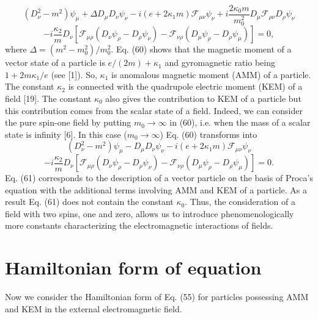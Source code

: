 \documentclass[a4paper,12pt]{article}
\begin{document}
\[
\left(D^2_\nu -m^2\right)\psi_{\mu}+\Delta D_\mu D_\nu \psi_\nu
-i\left(e+2\kappa_1m\right)\mathcal{F}_{\mu\nu}\psi_\nu+
i\frac{2\kappa_0 m}{m_0^2}D_\mu
\mathcal{F}_{\rho\nu}D_\rho\psi_\nu
\]
\vspace{-8mm}
\begin{equation}
\label{60}
\end{equation}
\vspace{-8mm}
\[
-i\frac{\kappa_2}{m}D_\nu\left[\mathcal{F}_{\mu\rho}\left(D_\nu\psi_\rho-
D_\rho\psi_\nu\right)-\mathcal{F}_{\nu\rho}\left(D_\mu\psi_\rho-D_\rho
\psi_\mu\right)\right]=0,
\]
where $\Delta=(m^2-m_0^2)/m_0^2$. Eq. (60) shows that the magnetic
moment of a vector state of a particle is $e/(2m)+\kappa_1$ and
gyromagnetic ratio being $1+2m\kappa_1/e$ (see [1]). So,
$\kappa_1$ is anomalous magnetic moment (AMM) of a particle. The
constant $\kappa_2$ is connected with the quadrupole electric
moment (KEM) of a field [19]. The constant $\kappa_0$ also gives
the contribution to KEM of a particle but this contribution comes
from the scalar state of a field. Indeed, we can consider the pure
spin-one field by putting $m_0\rightarrow\infty$ in (60), i.e.
when the mass of a scalar state is infinity [6]. In this case
($m_0\rightarrow\infty$) Eq. (60) transforms into
\[
\left(D^2_\nu -m^2\right)\psi_{\mu}-D_\mu D_\nu \psi_\nu
-i\left(e+2\kappa_1m\right)\mathcal{F}_{\mu\nu}\psi_\nu
\]
\vspace{-8mm}
\begin{equation}
\label{61}
\end{equation}
\vspace{-8mm}
\[
-i\frac{\kappa_2}{m}D_\nu\left[\mathcal{F}_{\mu\rho}\left(D_\nu\psi_\rho-
D_\rho\psi_\nu\right)-\mathcal{F}_{\nu\rho}\left(D_\mu\psi_\rho-
D_\rho\psi_\mu\right)\right]=0.
\]
Eq. (61) corresponds to the description of a vector particle on
the basis of Proca's equation with the additional terms involving
AMM and KEM of a particle. As a result Eq. (61) does not contain
the constant $\kappa_0$. Thus, the consideration of a field with
two spins, one and zero, allows us to introduce phenomenologically
more constants characterizing the electromagnetic interactions of
fields.

\section{Hamiltonian form of equation}

Now we consider the Hamiltonian form of Eq. (55) for particles
possessing AMM and KEM in the external electromagnetic field.
\end{document}
